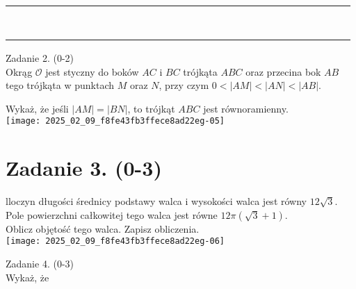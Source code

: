 \documentclass[10pt]{article}
\begin{document}
\begin{center}
\begin{tabular}{|c|c|c|c|c|c|c|c|c|c|c|c|c|c|c|c|c|c|c|c|c|c|c|c|c|c|c|c|c|c|c|}
\hline
 &  &  &  &  &  &  &  &  &  &  &  &  &  &  &  &  &  &  &  &  &  &  &  &  &  &  &  &  &  &  \\
\hline
 &  &  &  &  &  &  &  &  &  &  &  &  &  &  &  &  &  &  &  &  &  &  &  &  &  &  &  &  &  &  \\
\hline
 &  &  &  &  &  &  &  &  &  &  &  &  &  &  &  &  &  &  &  &  &  &  &  &  &  &  &  &  &  &  \\
\hline
 &  &  &  &  &  &  &  &  &  &  &  &  &  &  &  &  &  &  &  &  &  &  &  &  &  &  &  &  &  &  \\
\hline
 &  &  &  &  &  &  &  &  &  &  &  &  &  &  &  &  &  &  &  &  &  &  &  &  &  &  &  &  &  &  \\
\hline
 &  &  &  &  &  &  &  &  &  &  &  &  &  &  &  &  &  &  &  &  &  &  &  &  &  &  &  &  &  &  \\
\hline
 &  &  &  &  &  &  &  &  &  &  &  &  &  &  &  &  &  &  &  &  &  &  &  &  &  &  &  &  &  &  \\
\hline
 &  &  &  &  &  &  &  &  &  &  &  &  &  &  &  &  &  &  &  &  &  &  &  &  &  &  &  &  &  &  \\
\hline
 &  &  &  &  &  &  &  &  &  &  &  &  &  &  &  &  &  &  &  &  &  &  &  &  &  &  &  &  &  &  \\
\hline
\end{tabular}
\end{center}

Zadanie 2. (0-2)\\
Okrąg \(\mathcal{O}\) jest styczny do boków \(A C\) i \(B C\) trójkąta \(A B C\) oraz przecina bok \(A B\) tego trójkąta w punktach \(M\) oraz \(N\), przy czym \(0<|A M|<|A N|<|A B|\).

Wykaż, że jeśli \(|A M|=|B N|\), to trójkąt \(A B C\) jest równoramienny.\\
\texttt{[image: 2025\_02\_09\_f8fe43fb3ffece8ad22eg-05]}

\section*{Zadanie 3. (0-3)}
lloczyn długości średnicy podstawy walca i wysokości walca jest równy \(12 \sqrt{3}\).\\
Pole powierzchni całkowitej tego walca jest równe \(12 \pi(\sqrt{3}+1)\).\\
Oblicz objętość tego walca. Zapisz obliczenia.\\
\texttt{[image: 2025\_02\_09\_f8fe43fb3ffece8ad22eg-06]}

Zadanie 4. (0-3)\\
Wykaż, że
\end{document}
